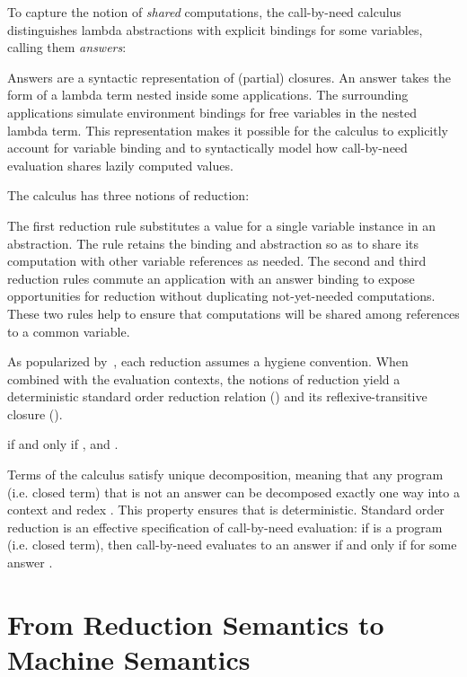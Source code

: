 \documentclass{LMCS}
\theoremstyle{plain}
\theoremstyle{remark}
\newcommand{\topic}[1]{}
\begin{document}
To capture the notion of \emph{shared} computations, the call-by-need calculus 
distinguishes lambda abstractions with explicit bindings for some variables,
calling them \emph{answers}:

Answers are a syntactic representation of (partial) closures.  An answer takes
the form of a lambda term nested inside some applications.  The surrounding
applications simulate environment bindings for free variables in the nested
lambda term.
This representation makes it possible for the calculus to explicitly account
for variable binding and to syntactically model how call-by-need
evaluation shares lazily computed values.


The calculus has three notions of reduction:

The first reduction rule substitutes a value for a single variable instance in
an abstraction. The rule retains the binding and abstraction so as to share its
computation with other variable references as needed. The second and third
reduction rules commute an application with an answer binding to expose
opportunities for reduction without duplicating not-yet-needed computations.
These two rules help to ensure that computations will be shared among
references to a common variable.

As popularized by~\citet{barendregt}, each reduction assumes a hygiene
convention.  When combined with the evaluation contexts, the notions of
reduction yield a deterministic standard order reduction relation () and
its reflexive-transitive closure ().
\begin{defi}
  \label{def:sr}
   if and only if ,  
  and .
\end{defi}
Terms of the calculus satisfy unique decomposition, meaning that any
program (i.e. closed term) that is not an answer can be decomposed exactly one
way into a context  and redex . This property ensures that
 is deterministic.
Standard order reduction is an effective specification of call-by-need
evaluation: if  is a program (i.e. closed term), then  call-by-need
evaluates to an answer if and only if  for some answer .



\section{From Reduction Semantics to Machine Semantics}
\label{sec:reduction}

\topic{The point: Reduction Semantics don't immediately point to a
  tail-recursive implementation}
\end{document}
